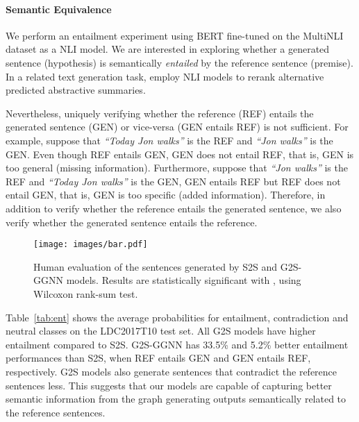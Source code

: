 \documentclass[11pt,a4paper]{article}
\begin{document}
\paragraph{Semantic Equivalence}
We perform an entailment experiment using BERT \cite{devlin2018bert} fine-tuned on the MultiNLI dataset \cite{williams-etal-2018-broad} as a NLI model. We are interested in exploring whether a generated sentence (hypothesis) is semantically \emph{entailed} by the reference sentence (premise). In a related text generation task, \citet{nli_summaries_acl} employ NLI models to rerank alternative predicted abstractive summaries. 

Nevertheless, uniquely verifying whether the reference (REF) entails the generated sentence (GEN) or vice-versa (GEN entails REF) is not sufficient. For example, suppose that \textit{``Today Jon walks''} is the REF and \textit{``Jon walks''} is the GEN. Even though REF entails GEN, GEN does not entail REF, that is, GEN is too general (missing information). Furthermore, suppose that \textit{``Jon walks''} is the REF and \textit{``Today Jon walks''} is the GEN, GEN entails REF but REF does not entail GEN, that is, GEN is too specific (added information). Therefore, in addition to verify whether the reference entails the generated sentence, we also verify whether the generated sentence entails the reference.

 \begin{figure}[t]
    \centering
    \texttt{[image: images/bar.pdf]}
    \caption{Human evaluation of the sentences generated by {\selectfont S2S} and {\selectfont G2S-GGNN} models. Results are statistically significant with , using Wilcoxon rank-sum test.}
    \label{fig:humaneval}
\end{figure}
Table~\ref{tab:ent} shows the average probabilities for entailment, contradiction and neutral classes on the LDC2017T10 test set. All {\selectfont G2S} models have higher entailment compared to {\selectfont S2S}. {\selectfont G2S-GGNN} has 33.5\% and 5.2\% better entailment performances than {\selectfont S2S}, when REF entails GEN and GEN entails REF, respectively. {\selectfont G2S} models also generate sentences that contradict the reference sentences less. This suggests that our models are capable of capturing better semantic information from the graph generating outputs semantically related to the reference sentences.
\end{document}
